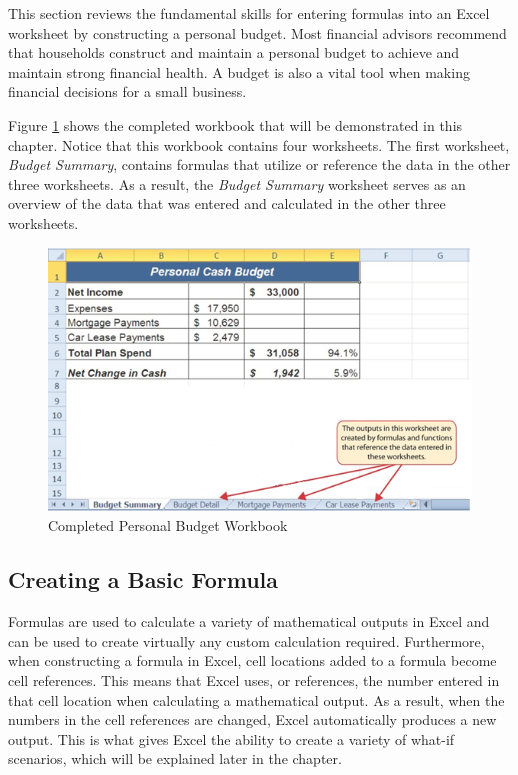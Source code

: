 This section reviews the fundamental skills for entering formulas into an Excel worksheet by constructing a personal budget. Most financial advisors recommend that households construct and maintain a personal budget to achieve and maintain strong financial health. A budget is also a vital tool when making financial decisions for a small business.

Figure \ref{02:fig01} shows the completed workbook that will be demonstrated in this chapter. Notice that this workbook contains four worksheets. The first worksheet, \textit{Budget Summary}, contains formulas that utilize or reference the data in the other three worksheets. As a result, the \textit{Budget Summary} worksheet serves as an overview of the data that was entered and calculated in the other three worksheets.

\begin{figure}[H]
	\centering
	\includegraphics[width=\maxwidth{.95\linewidth}]{gfx/ch02_fig01}
	\caption{Completed Personal Budget Workbook}
	\label{02:fig01}
\end{figure}

\subsection{Creating a Basic Formula}

Formulas are used to calculate a variety of mathematical outputs in Excel and can be used to create virtually any custom calculation required. Furthermore, when constructing a formula in Excel, cell locations added to a formula become cell references. This means that Excel uses, or references, the number entered in that cell location when calculating a mathematical output. As a result, when the numbers in the cell references are changed, Excel automatically produces a new output. This is what gives Excel the ability to create a variety of what-if scenarios, which will be explained later in the chapter.

